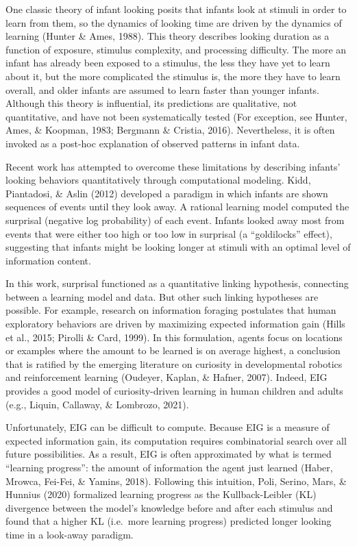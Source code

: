 \documentclass[10pt, letterpaper]{article}
\begin{document}
One classic theory of infant looking posits that infants look at stimuli
in order to learn from them, so the dynamics of looking time are driven
by the dynamics of learning (Hunter \& Ames, 1988). This theory
describes looking duration as a function of exposure, stimulus
complexity, and processing difficulty. The more an infant has already
been exposed to a stimulus, the less they have yet to learn about it,
but the more complicated the stimulus is, the more they have to learn
overall, and older infants are assumed to learn faster than younger
infants. Although this theory is influential, its predictions are
qualitative, not quantitative, and have not been systematically tested
(For exception, see Hunter, Ames, \& Koopman, 1983; Bergmann \& Cristia,
2016). Nevertheless, it is often invoked as a post-hoc explanation of
observed patterns in infant data.

Recent work has attempted to overcome these limitations by describing
infants' looking behaviors quantitatively through computational
modeling. Kidd, Piantadosi, \& Aslin (2012) developed a paradigm in
which infants are shown sequences of events until they look away. A
rational learning model computed the surprisal (negative log
probability) of each event. Infants looked away most from events that
were either too high or too low in surprisal (a ``goldilocks'' effect),
suggesting that infants might be looking longer at stimuli with an
optimal level of information content.

In this work, surprisal functioned as a quantitative linking hypothesis,
connecting between a learning model and data. But other such linking
hypotheses are possible. For example, research on information foraging
postulates that human exploratory behaviors are driven by maximizing
expected information gain (Hills et al., 2015; Pirolli \& Card, 1999).
In this formulation, agents focus on locations or examples where the
amount to be learned is on average highest, a conclusion that is
ratified by the emerging literature on curiosity in developmental
robotics and reinforcement learning (Oudeyer, Kaplan, \& Hafner, 2007).
Indeed, EIG provides a good model of curiosity-driven learning in human
children and adults (e.g., Liquin, Callaway, \& Lombrozo, 2021).

Unfortunately, EIG can be difficult to compute. Because EIG is a measure
of expected information gain, its computation requires combinatorial
search over all future possibilities. As a result, EIG is often
approximated by what is termed ``learning progress'': the amount of
information the agent just learned (Haber, Mrowca, Fei-Fei, \& Yamins,
2018). Following this intuition, Poli, Serino, Mars, \& Hunnius (2020)
formalized learning progress as the Kullback-Leibler (KL) divergence
between the model's knowledge before and after each stimulus and found
that a higher KL (i.e.~more learning progress) predicted longer looking
time in a look-away paradigm.
\end{document}

